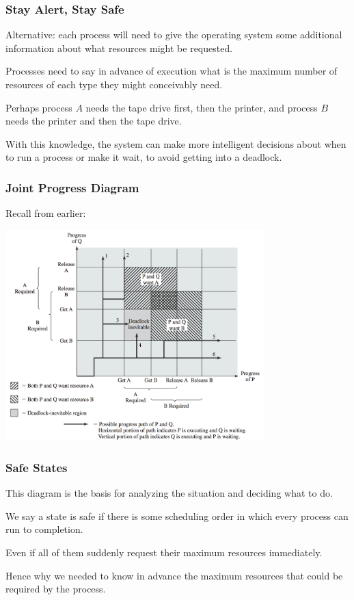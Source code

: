 \begin{frame}
\frametitle{Stay Alert, Stay Safe}

Alternative: each process will need to give the operating system some additional information about what resources might be requested. 

Processes need to say in advance of execution what is the maximum number of resources of each type they might conceivably need. 

Perhaps process $A$ needs the tape drive first, then the printer, and process $B$ needs the printer and then the tape drive. 

With this knowledge, the system can make more intelligent decisions about when to run a process or make it wait, to avoid getting into a deadlock.

\end{frame}

\begin{frame}
\frametitle{Joint Progress Diagram}

Recall from earlier:

\begin{center}
\includegraphics[width=0.75\textwidth]{images/joint-progress}
\end{center}


\end{frame}

\begin{frame}
\frametitle{Safe States}

This diagram is the basis for analyzing the situation and deciding what to do.

We say a state is \alert{safe} if there is some scheduling order in which every process can run to completion.

Even if all of them suddenly request their maximum resources immediately. 

Hence why we needed to know in advance the maximum resources that could be required by the process. 

\end{frame}

